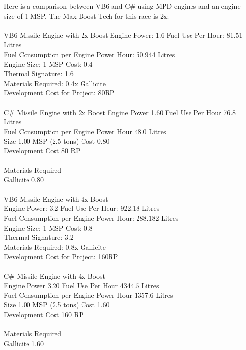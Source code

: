 \documentclass[../../Aurora C# unofficial manual.tex]{subfiles}
\begin{document}
	Here is a comparison between VB6 and C\# using MPD engines and an engine size of 1 MSP. The Max Boost Tech for this race is 2x:\\\\
	VB6 Missile Engine with 2x Boost\newline
	Engine Power: 1.6 \space\space\space Fuel Use Per Hour: 81.51 Litres\\
	Fuel Consumption per Engine Power Hour: 50.944 Litres\\
	Engine Size: 1 MSP \space\space\space Cost: 0.4\\
	Thermal Signature: 1.6\\
	Materials Required: 0.4x Gallicite\\
	Development Cost for Project: 80RP\\\\
	C\# Missile Engine with 2x Boost
	Engine Power 1.60 \space\space\space Fuel Use Per Hour 76.8 Litres\\
	Fuel Consumption per Engine Power Hour 48.0 Litres\\
	Size 1.00 MSP (2.5 tons) \space\space\space Cost 0.80\\
	Development Cost 80 RP\\\\
	Materials Required\\
	Gallicite  0.80\\\\
	VB6 Missile Engine with 4x Boost\\
	Engine Power: 3.2 \space\space\space Fuel Use Per Hour: 922.18 Litres\\
	Fuel Consumption per Engine Power Hour: 288.182 Litres\\
	Engine Size: 1 MSP \space\space\space Cost: 0.8\\
	Thermal Signature: 3.2\\
	Materials Required: 0.8x Gallicite\\
	Development Cost for Project: 160RP\\\\
	C\# Missile Engine with 4x Boost\\
	Engine Power 3.20 \space\space\space Fuel Use Per Hour 4344.5 Litres\\
	Fuel Consumption per Engine Power Hour 1357.6 Litres\\
	Size 1.00 MSP (2.5 tons) \space\space\space Cost 1.60\\
	Development Cost 160 RP\\\\
	Materials Required\\
	Gallicite  1.60
\end{document}

